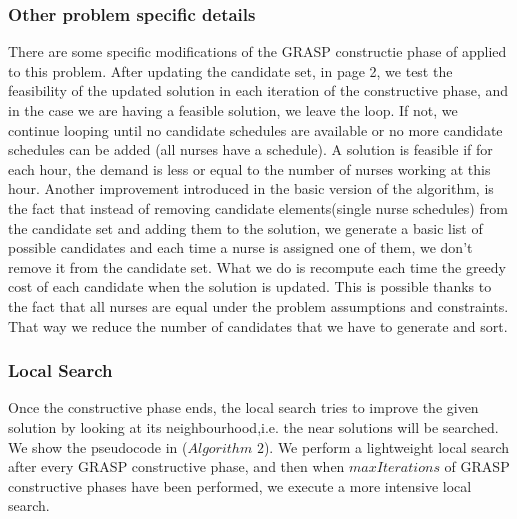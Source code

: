 \subsubsection{Other problem specific details}

There are some specific modifications of the GRASP constructie phase of \cite{grasp} applied to this problem. After updating the candidate set, in \cite{grasp} page 2, we test the feasibility of the updated solution in each iteration of the constructive phase, and in the case we are having a feasible solution, we leave the loop. If not, we continue looping until no candidate schedules are available or no more candidate schedules can be added (all nurses have a schedule). A solution is feasible if for each hour, the demand is less or equal to the number of nurses working at this hour. Another improvement introduced in the basic version of the algorithm, is the fact that instead of removing candidate elements(single nurse schedules) from the candidate set and adding them to the solution, we generate a basic list of possible candidates and each time a nurse is assigned one of them, we don't remove it from the candidate set. What we do is recompute each time the greedy cost of each candidate when the solution is updated. This is possible thanks to the fact that all nurses are equal under the problem assumptions and constraints. That way we reduce the number of candidates that we have to generate and sort.



\subsubsection{Local Search}

Once the constructive phase ends, the local search tries to improve the given solution by looking at its neighbourhood,i.e. the near solutions will be searched. We show the pseudocode in ($Algorithm$ $2$). We perform a lightweight local search after every GRASP constructive phase, and then when $maxIterations$ of GRASP constructive phases have been performed, we execute a more intensive local search.


